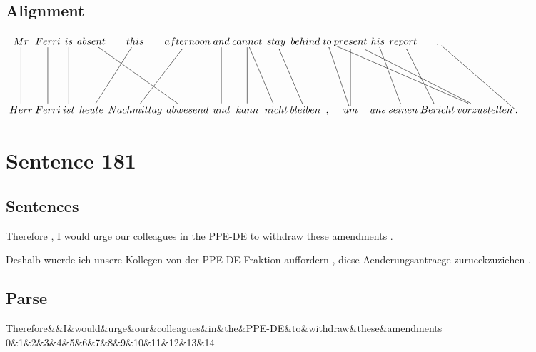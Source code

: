 \documentclass{report}
\begin{document}
\subsection*{Alignment}
\scriptsize{
$
\xymatrix@C-2.3pc{
Mr \ar @{-} [dd] & Ferri \ar @{-} [dd] & is \ar @{-} [dd] & absent \ar @{-} [ddrr] & this \ar @{-} [ddl] & afternoon \ar @{-} [ddl] & and \ar @{-} [dd] & cannot \ar @{-} [dd] \ar @{-} [ddr] & stay \ar @{-} [ddr] & behind & to \ar @{-} [ddrrrrr] \ar @{-} [ddr] & present \ar @{-} [dd] \ar @{-} [ddrrrr] & his \ar @{-} [ddr] & report \ar @{-} [ddr] & . \ar @{-} [ddrr]\\\\
Herr & Ferri & ist & heute & Nachmittag & abwesend & und & kann & nicht & bleiben & , & um & uns & seinen & Bericht & vorzustellen & .
}$}
\newpage\section*{Sentence 181}

\subsection*{Sentences}
Therefore , I would urge our colleagues in the PPE-DE to withdraw these amendments .

\noindent Deshalb wuerde ich unsere Kollegen von der PPE-DE-Fraktion auffordern , diese Aenderungsantraege zurueckzuziehen .



\subsection*{Parse}
\begin{dependency}[theme=simple]
\begin{deptext}[column sep=.5cm, row sep=.1ex]
Therefore\&\&I\&would\&urge\&our\&colleagues\&in\&the\&PPE-DE\&to\&withdraw\&these\&amendments\\
0\&1\&2\&3\&4\&5\&6\&7\&8\&9\&10\&11\&12\&13\&14\\
\end{deptext}
\end{dependency}
\end{document}
